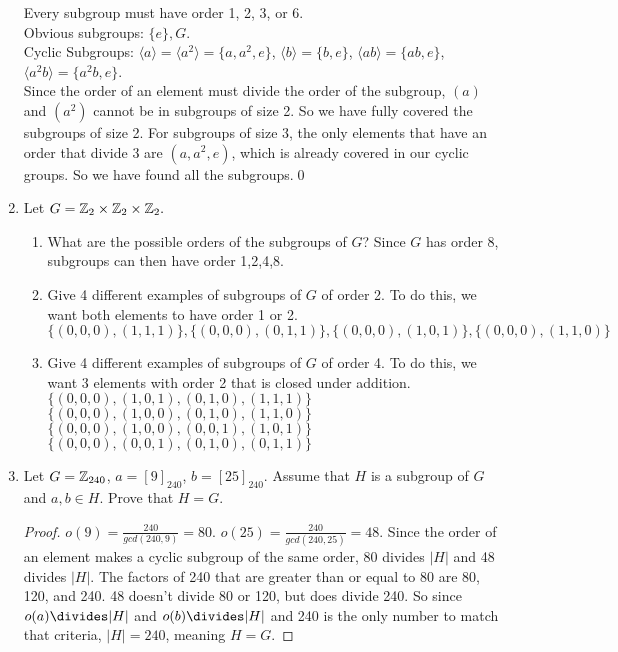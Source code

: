 \documentclass[12pt]{article}
\begin{document}
\begin{enumerate}
		
		Every subgroup must have order 1, 2, 3, or 6.\\
		Obvious subgroups: $\{e\}, G$.\\
		Cyclic Subgroups: $\langle a \rangle = \langle a^2 \rangle = \{a,a^2,e\}$, $\langle b \rangle = \{b,e\}$, $\langle ab \rangle = \{ab,e\}$, $\langle a^2b \rangle = \{a^2b,e\}$.\\
		Since the order of an element must divide the order of the subgroup, $(a)$ and $(a^2)$ cannot be in subgroups of size 2. So we have fully covered the subgroups of size 2. For subgroups of size 3, the only elements that have an order that divide 3 are $(a,a^2,e)$, which is already covered in our cyclic groups. So we have found all the subgroups.\qed
		
		\item Let $G = \mathbb{Z}_2 \times \mathbb{Z}_2 \times \mathbb{Z}_2.$\\
		\begin{enumerate}
			\item What are the possible orders of the subgroups of $G$?\m
			Since $G$ has order 8, subgroups can then have order 1,2,4,8.
			\item Give 4 different examples of subgroups of $G$ of order 2.\m
			To do this, we want both elements to have order 1 or 2.\\
			$\{(0,0,0),(1,1,1)\},\{(0,0,0),(0,1,1)\},\{(0,0,0),(1,0,1)\},\{(0,0,0),(1,1,0)\}$
			\item Give 4 different examples of subgroups of $G$ of order 4.\m
			To do this, we want 3 elements with order 2 that is closed under addition.\\
			$\{(0,0,0),(1,0,1),(0,1,0),(1,1,1)\}$\\
			$\{(0,0,0),(1,0,0),(0,1,0),(1,1,0)\}$\\
			$\{(0,0,0),(1,0,0),(0,0,1),(1,0,1)\}$\\
			$\{(0,0,0),(0,0,1),(0,1,0),(0,1,1)\}$
		\end{enumerate}
	
		\item Let $G = \mathbb{Z}_{240}$, $a = [9]_{240}$, $b = [25]_{240}$. Assume that $H$ is a subgroup of $G$ and $a,b \in H$. Prove that $H = G$.
		\begin{proof}
			$o(9) = \frac{240}{gcd(240,9)} = 80$. $o(25) = \frac{240}{gcd(240,25)} = 48$. Since the order of an element makes a cyclic subgroup of the same order, 80 divides $|H|$ and 48 divides $|H|$. The factors of 240 that are greater than or equal to 80 are 80, 120, and 240. 48 doesn't divide 80 or 120, but does divide 240. So since $o(a)\divides|H|$ and $o(b)\divides|H|$ and 240 is the only number to match that criteria, $|H| = 240$, meaning $H = G$.
		\end{proof}
		

\end{enumerate}
\end{document}
